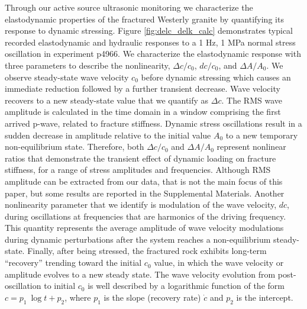 \documentclass[draft]{agujournal2019}
\begin{document}
Through our active source ultrasonic monitoring we characterize the elastodynamic properties of the fractured Westerly granite by quantifying its response to dynamic stressing. Figure \ref{fig:delc_delk_calc} demonstrates typical recorded elastodynamic and hydraulic responses to a 1 Hz, 1 MPa normal stress oscillation in experiment p4966. We characterize the elastodynamic response with three parameters to describe the nonlinearity, $ \Delta c/c_0 $, $ dc/c_0 $, and $ \Delta A/A_0 $. We observe steady-state wave velocity $ c_0 $ before dynamic stressing which causes an immediate reduction followed by a further transient decrease. Wave velocity recovers to a new steady-state value that we quantify as  $ \Delta c $.
The RMS wave amplitude is calculated in the time domain in a window comprising the first arrived p-wave, related to fracture stiffness. Dynamic stress oscillations result in a sudden decrease in amplitude relative to the initial value  $ A_0 $ to a new temporary non-equilibrium state. Therefore, both $ \Delta c/c_0 $ and $ \Delta A/A_0 $ represent nonlinear ratios that demonstrate the transient effect of dynamic loading on fracture stiffness, for a range of stress amplitudes and frequencies. Although RMS amplitude can be extracted from our data, that is not the main focus of this paper, but some results are reported in the Supplemental Materials.  
Another nonlinearity parameter that we identify is modulation of the wave velocity, $ dc $, during oscillations at frequencies that are harmonics of the driving frequency. This quantity represents the average amplitude of wave velocity modulations during dynamic perturbations after the system reaches a non-equilibrium steady-state. Finally, after being stressed, the fractured rock exhibits long-term ``recovery'' trending toward the initial $ c_0 $ value, in which the wave velocity or amplitude evolves to a new steady state. The wave velocity evolution from post-oscillation to initial $ c_0 $ is well described by a logarithmic function of the form $ c = p_1\ \log{t} + p_2 $, where $p_1$ is the slope (recovery rate) $ \dot c $ and $p_2$ is the intercept. 
\end{document}
